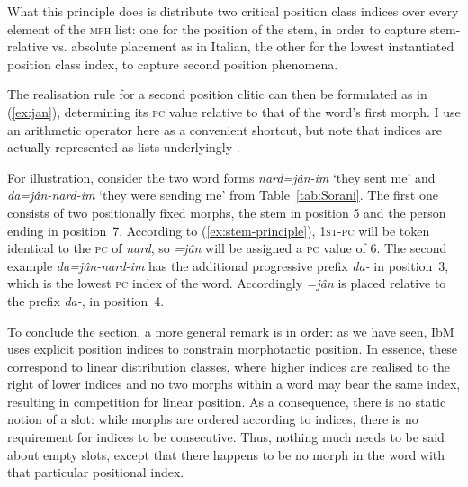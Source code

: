\documentclass[output=paper
	        ,collection
	        ,collectionchapter
 	        ,biblatex
                ,babelshorthands
                ,newtxmath
                ,draftmode
                ,colorlinks, citecolor=brown
]{langscibook}
\begin{document}
\begin{exe}
\begin{xlist}
\begin{exe}
\begin{xlist}
What this principle does is distribute two critical position class
indices over every element of the \textsc{mph} list: one for the
position of the stem, in order to capture stem-relative vs. absolute placement as
in Italian, the other for the lowest instantiated position class index,
to capture second position phenomena. 

The realisation rule for a second position clitic can then be
formulated  as
in (\ref{ex:jan}), determining its \textsc{pc} value relative to that of the
word's first morph. I use an arithmetic operator here as a convenient
shortcut, but note that indices are actually represented as lists 
underlyingly \citep{bonami-crysmann:2013}. 

\begin{exe}
  \ex \label{ex:jan}
\end{exe}

For illustration, consider the two word forms \textit{nard=jân-im}
`they sent me' and \textit{da=jân-nard-im} `they were sending me' from
Table~\ref{tab:Sorani}. The first one consists of two positionally
fixed morphs, the stem in position 5 and the person ending in
position~7. According to (\ref{ex:stem-principle}), \textsc{1st-pc}
will be token identical to the \textsc{pc} of \textit{nard}, so
\textit{=jân} will be assigned a \textsc{pc} value of 6. The second
example \textit{da=jân-nard-im} has the additional progressive prefix
\textit{da-} in position~3, which is the lowest \textsc{pc} index of the word. Accordingly
\textit{=jân} is placed relative to the prefix \textit{da-}, in position~4.

To conclude the section, a more general remark is in order: as we have
seen, IbM uses explicit position indices to constrain morphotactic
position. In essence, these correspond to linear distribution classes,
where higher indices are realised to the right of lower indices
and no two morphs within a word may bear the same index, resulting in
competition for linear position. As a consequence, there is no static
notion of a slot: while morphs are ordered according to indices, there
is no requirement for indices to be consecutive. Thus, nothing much
needs to be said about empty slots, except that there happens to be no
morph in the word with that particular positional index. 



\end{xlist}
\end{exe}
\end{xlist}
\end{exe}
\end{document}
